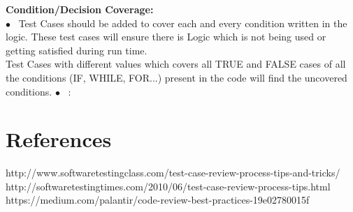 \documentclass[10pt]{article}
\begin{document}
 \textbf{Condition/Decision Coverage:} 
\\
$\bullet$~	Test Cases should be added to cover each and every condition written in the logic. These test cases will ensure there is Logic which is not being used or getting satisfied during run time.
\\
Test Cases with different values which covers all TRUE and FALSE cases of all the conditions (IF, WHILE, FOR...) present in the code will find the uncovered conditions.
$\bullet$~ \textbf{         } :


\section*{\normalsize References}

http://www.softwaretestingclass.com/test-case-review-process-tips-and-tricks/
\\
http://softwaretestingtimes.com/2010/06/test-case-review-process-tips.html\\

https://medium.com/palantir/code-review-best-practices-19e02780015f
\end{document}
